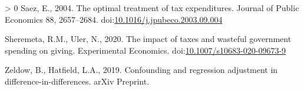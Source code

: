 \documentclass[ review  , 3p ]{elsarticle}
\newlength{\cslhangindent}
\newenvironment{CSLReferences}[3] %
 {%
  \setlength{\parindent}{0pt}
  \ifodd #1 \everypar{\setlength{\hangindent}{\cslhangindent}}\ignorespaces\fi
  \ifnum #2 > 0
  \setlength{\parskip}{#2\baselineskip}
  \fi
 }%
 {}
\begin{document}
\begin{CSLReferences}{1}{0}
  \leavevmode\hypertarget{ref-Saez2004}{}%
  Saez, E., 2004. The optimal treatment of tax expenditures. Journal of Public Economics 88, 2657--2684. doi:\href{https://doi.org/10.1016/j.jpubeco.2003.09.004}{10.1016/j.jpubeco.2003.09.004}

  \leavevmode\hypertarget{ref-Sheremeta2020}{}%
  Sheremeta, R.M., Uler, N., 2020. The impact of taxes and wasteful government spending on giving. Experimental Economics. doi:\href{https://doi.org/10.1007/s10683-020-09673-9}{10.1007/s10683-020-09673-9}

  \leavevmode\hypertarget{ref-Zeldow2019}{}%
  Zeldow, B., Hatfield, L.A., 2019. Confounding and regression adjustment in difference-in-differences. arXiv Preprint.

  \end{CSLReferences}
\end{document}

